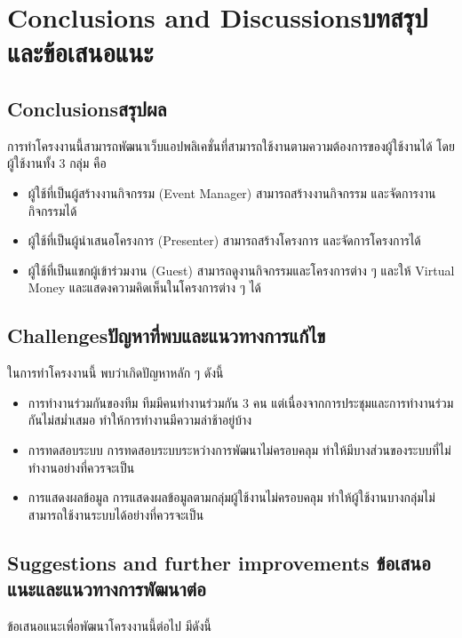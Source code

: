 \chapter{\ifenglish Conclusions and Discussions\else บทสรุปและข้อเสนอแนะ\fi}

\section{\ifenglish Conclusions\else สรุปผล\fi}
การทําโครงงานนี้สามารถพัฒนาเว็บแอปพลิเคชั่นที่สามารถใช้งานตามความต้องการของผู้ใช้งานได้
โดยผู้ใช้งานทั้ง 3 กลุ่ม คือ
\begin{itemize}
    \item ผู้ใช้ที่เป็นผู้สร้างงานกิจกรรม (Event Manager)
          สามารถสร้างงานกิจกรรม และจัดการงานกิจกรรมได้
    \item ผู้ใช้ที่เป็นผู้นำเสนอโครงการ (Presenter)
          สามารถสร้างโครงการ และจัดการโครงการได้
    \item ผู้ใช้ที่เป็นแขกผู้เข้าร่วมงาน (Guest)
          สามารถดูงานกิจกรรมและโครงการต่าง ๆ และให้ Virtual Money และแสดงความคิดเห็นในโครงการต่าง ๆ ได้
\end{itemize}
\section{\ifenglish Challenges\else ปัญหาที่พบและแนวทางการแก้ไข\fi}
ในการทำโครงงานนี้ พบว่าเกิดปัญหาหลัก ๆ ดังนี้

\begin{itemize}
    \item การทำงานร่วมกันของทีม
          ทีมมีคนทำงานร่วมกัน 3 คน แต่เนื่องจากการประชุมและการทำงานร่วมกันไม่สม่ำเสมอ ทำให้การทำงานมีความล่าช้าอยู่บ้าง
    \item การทดสอบระบบ
          การทดสอบระบบระหว่างการพัฒนาไม่ครอบคลุม ทำให้มีบางส่วนของระบบที่ไม่ทำงานอย่างที่ควรจะเป็น
    \item การแสดงผลข้อมูล
          การแสดงผลข้อมูลตามกลุ่มผู้ใช้งานไม่ครอบคลุม ทำให้ผู้ใช้งานบางกลุ่มไม่สามารถใช้งานระบบได้อย่างที่ควรจะเป็น
\end{itemize}

\section{\ifenglish%
      Suggestions and further improvements
  \else%
      ข้อเสนอแนะและแนวทางการพัฒนาต่อ
  \fi
 }

ข้อเสนอแนะเพื่อพัฒนาโครงงานนี้ต่อไป มีดังนี้



